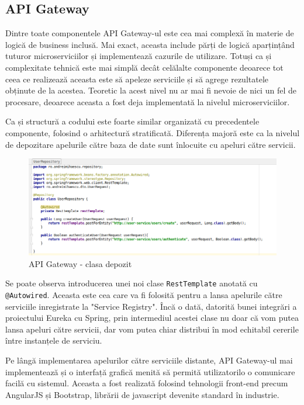 \documentclass[12pt, a4paper, oneside, romanian]{teza-upb}
\begin{document}
\newpage
\subsection{API Gateway}

Dintre toate componentele API Gateway-ul este cea mai complexă în materie de logică de business inclusă. Mai exact, aceasta include părți de logică aparțințând tuturor microserviciilor și implementează cazurile de utilizare. Totuși ca și complexitate tehnică este mai simplă decât celălalte componente deoarece tot ceea ce realizează aceasta este să apeleze serviciile și să agrege rezultatele obținute de la acestea. Teoretic la acest nivel nu ar mai fi nevoie de nici un fel de procesare, deoarece aceasta a fost deja implementată la nivelul microserviciilor.

Ca și structură a codului este foarte similar organizată cu precedentele componente, folosind o arhitectură stratificată. Diferența majoră este ca la nivelul de depozitare apelurile către baza de date sunt înlocuite cu apeluri către servicii.


\begin{figure}[ht]
\centering
\includegraphics[scale=0.5]{img/spring-boot-repo-remote-call.png}
\caption{API Gateway - clasa depozit}
\label{fig:arhi_componente}
\end{figure}

Se poate observa introducerea unei noi clase \texttt{RestTemplate} anotată cu \texttt{@Autowired}. Aceasta este cea care va fi folosită pentru a lansa apelurile către serviciile inregistrate la "Service Registry". Încă o dată, datorită bunei integrări a proiectului Eureka cu Spring, prin intermediul acestei clase nu doar că vom putea lansa apeluri către servicii, dar vom putea chiar distribui în mod echitabil cererile între instanțele de serviciu.

Pe lângă implementarea apelurilor către serviciile distante, API Gateway-ul mai implementează și o interfață grafică menită să permită utilizatorilo o comunicare facilă cu sistemul. Aceasta a fost realizată folosind tehnologii front-end precum AngularJS și Bootstrap, librării de javascript devenite standard în industrie.
\end{document}
